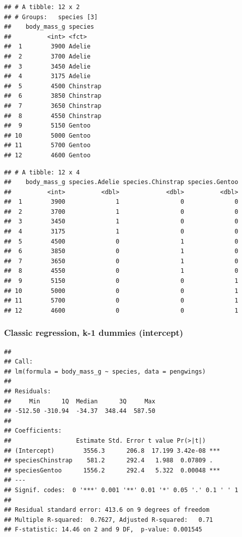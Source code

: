 \documentclass[
  openany]{book}
\begin{document}
\begin{verbatim}
## # A tibble: 12 x 2
## # Groups:   species [3]
##    body_mass_g species  
##          <int> <fct>    
##  1        3900 Adelie   
##  2        3700 Adelie   
##  3        3450 Adelie   
##  4        3175 Adelie   
##  5        4500 Chinstrap
##  6        3850 Chinstrap
##  7        3650 Chinstrap
##  8        4550 Chinstrap
##  9        5150 Gentoo   
## 10        5000 Gentoo   
## 11        5700 Gentoo   
## 12        4600 Gentoo
\end{verbatim}

\begin{verbatim}
## # A tibble: 12 x 4
##    body_mass_g species.Adelie species.Chinstrap species.Gentoo
##          <int>          <dbl>             <dbl>          <dbl>
##  1        3900              1                 0              0
##  2        3700              1                 0              0
##  3        3450              1                 0              0
##  4        3175              1                 0              0
##  5        4500              0                 1              0
##  6        3850              0                 1              0
##  7        3650              0                 1              0
##  8        4550              0                 1              0
##  9        5150              0                 0              1
## 10        5000              0                 0              1
## 11        5700              0                 0              1
## 12        4600              0                 0              1
\end{verbatim}

\hypertarget{classic-regression-k-1-dummies-intercept}{%
\subsubsection{Classic regression, k-1 dummies (intercept)}\label{classic-regression-k-1-dummies-intercept}}

\begin{verbatim}
## 
## Call:
## lm(formula = body_mass_g ~ species, data = pengwings)
## 
## Residuals:
##     Min      1Q  Median      3Q     Max 
## -512.50 -310.94  -34.37  348.44  587.50 
## 
## Coefficients:
##                  Estimate Std. Error t value Pr(>|t|)    
## (Intercept)        3556.3      206.8  17.199 3.42e-08 ***
## speciesChinstrap    581.2      292.4   1.988  0.07809 .  
## speciesGentoo      1556.2      292.4   5.322  0.00048 ***
## ---
## Signif. codes:  0 '***' 0.001 '**' 0.01 '*' 0.05 '.' 0.1 ' ' 1
## 
## Residual standard error: 413.6 on 9 degrees of freedom
## Multiple R-squared:  0.7627, Adjusted R-squared:   0.71 
## F-statistic: 14.46 on 2 and 9 DF,  p-value: 0.001545
\end{verbatim}
\end{document}

